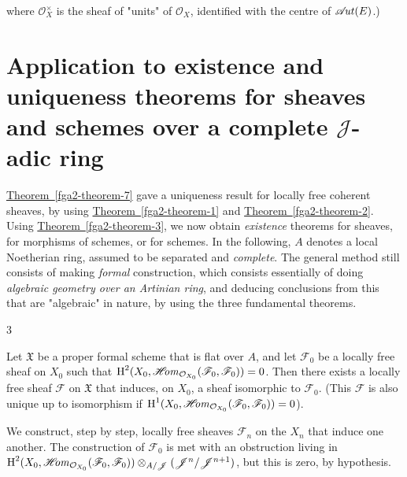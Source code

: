   where \(\mathcal {O}_X^\times \) is the sheaf of "units" of \(\mathcal {O}_X\), identified with the centre of \(\mathscr {A}\kern  -1.75pt\mathit {ut}(E)\).)\chapter{Application to existence and uniqueness theorems for sheaves and schemes over a complete \(\mathscr {J}\)-adic ring}\thispagestyle{fancy}\label{fga2-6}\par{}\hyperref[fga2-theorem-7]{Theorem~\ref*{fga2-theorem-7}} gave a uniqueness result for locally free coherent sheaves, by using \hyperref[fga2-theorem-1]{Theorem~\ref*{fga2-theorem-1}} and \hyperref[fga2-theorem-2]{Theorem~\ref*{fga2-theorem-2}}.
  Using \hyperref[fga2-theorem-3]{Theorem~\ref*{fga2-theorem-3}}, we now obtain \emph{existence} theorems for sheaves, for morphisms of schemes, or for schemes.
  In the following, \(A\) denotes a local Noetherian ring, assumed to be separated and \emph{complete}.
  The general method still consists of making \emph{formal} construction, which consists essentially of doing \emph{algebraic geometry over an Artinian ring}, and deducing conclusions from this that are "algebraic" in nature, by using the three fundamental theorems.\begin{proposition}{3}\label{fga2-proposition-3}\skipsinglepar\par{}Let \(\mathfrak {X}\) be a proper formal scheme that is flat over \(A\), and let \(\mathscr {F}_0\) be a locally free sheaf on \(X_0\) such that \(\operatorname {H}^2(X_0,\mathscr {H}\kern  -2.5pt\mathit {om}_{\mathcal {O}_{X_0}}(\mathscr {F}_0,\mathscr {F}_0))=0\).
    Then there exists a locally free sheaf \(\mathscr {F}\) on \(\mathfrak {X}\) that induces, on \(X_0\), a sheaf isomorphic to \(\mathscr {F}_0\).
    (This \(\mathscr {F}\) is also unique up to isomorphism if \(\operatorname {H}^1(X_0,\mathscr {H}\kern  -2.5pt\mathit {om}_{\mathcal {O}_{X_0}}(\mathscr {F}_0,\mathscr {F}_0))=0\)).\end{proposition}\par{}We construct, step by step, locally free sheaves \(\mathscr {F}_n\) on the \(X_n\) that induce one another.
  The construction of \(\mathscr {F}_0\) is met with an obstruction living in \(\operatorname {H}^2(X_0,\mathscr {H}\kern  -2.5pt\mathit {om}_{\mathcal {O}_{X_0}}(\mathscr {F}_0,\mathscr {F}_0))\otimes _{A/\mathscr {J}}(\mathscr {J}^n/\mathscr {J}^{n+1})\), but this is zero, by hypothesis.
